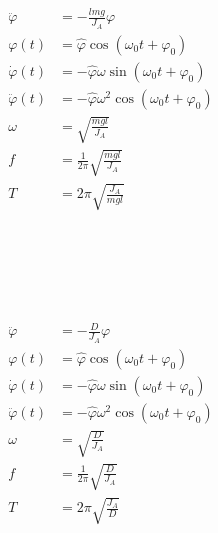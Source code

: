 \begin{boxleft}
\\
\\
\\
\\
\\
\end{boxleft}\begin{boxrightshaded}
\begin{align}
\ddot{\varphi}&=-\frac{lmg}{J_A}\varphi\\
\varphi(t)&=\hat{\varphi}\cos(\omega_0 t+\varphi_0)\\
\dot{\varphi}(t)&=-\hat{\varphi}\omega\sin(\omega_0 t+\varphi_0)\\
\ddot{\varphi}(t)&=-\hat{\varphi}\omega^2\cos(\omega_0 t+\varphi_0)\\
\omega&=\sqrt{\frac{mgl}{J_A}}\\
f&=\frac{1}{2\pi}\sqrt{\frac{mgl}{J_A}}\\
T&=2\pi\sqrt{\frac{J_A}{mgl}}
\end{align}
\end{boxrightshaded}

\begin{boxleft}
\\
\\
\\
\\
\end{boxleft}\begin{boxrightshaded}
\begin{align}
\ddot{\varphi}&=-\frac{D}{J_A}\varphi\\
\varphi(t)&=\hat{\varphi}\cos(\omega_0 t+\varphi_0)\\
\dot{\varphi}(t)&=-\hat{\varphi}\omega\sin(\omega_0 t+\varphi_0)\\
\ddot{\varphi}(t)&=-\hat{\varphi}\omega^2\cos(\omega_0 t+\varphi_0)\\
\omega&=\sqrt{\frac{D}{J_A}}\\
f&=\frac{1}{2\pi}\sqrt{\frac{D}{J_A}}\\
T&=2\pi\sqrt{\frac{J_A}{D}}
\end{align}
\end{boxrightshaded}


